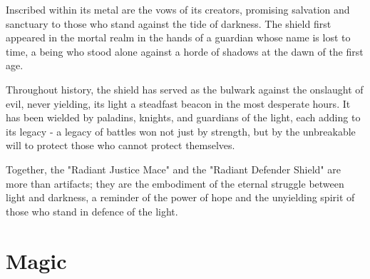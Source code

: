 Inscribed within its metal are the vows of its creators, promising salvation and sanctuary to those who stand against the tide of darkness. The shield first appeared in the mortal realm in the hands of a guardian whose name is lost to time, a being who stood alone against a horde of shadows at the dawn of the first age.

Throughout history, the shield has served as the bulwark against the onslaught of evil, never yielding, its light a steadfast beacon in the most desperate hours. It has been wielded by paladins, knights, and guardians of the light, each adding to its legacy - a legacy of battles won not just by strength, but by the unbreakable will to protect those who cannot protect themselves.

Together, the "Radiant Justice Mace" and the "Radiant Defender Shield" are more than artifacts; they are the embodiment of the eternal struggle between light and darkness, a reminder of the power of hope and the unyielding spirit of those who stand in defence of the light.

\section*{Magic}